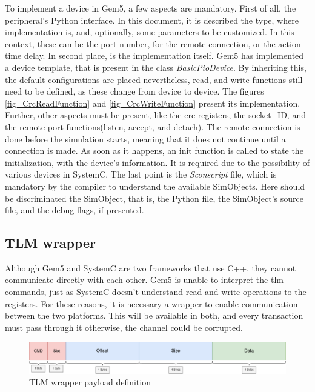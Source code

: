 To implement a device in Gem5, a few aspects are mandatory. First of all, the peripheral's Python interface. In this document, it is 
described the type, where implementation is, and, optionally, some parameters to be customized. In this context, these can be
the port number, for the remote connection, or the action time delay. In second place, is the implementation itself. Gem5 has implemented 
a device template, that is present in the class \textit{BasicPioDevice}. By inheriting this, the default configurations are placed 
nevertheless, read, and write functions still need to be defined, as these change from device to device. The figures \ref{fig_CrcReadFunction} and \ref{fig_CrcWriteFunction}
present its implementation. Further, other aspects must be present, like the \gls{crc} registers, the socket\_ID, and the remote 
port functions(listen, accept, and detach). The remote connection is done before the simulation starts, meaning that it does not
continue until a connection is made. As soon as it happens, an init function is called to state the initialization, with the 
device's information. It is required due to the possibility of various devices in SystemC. The last point is the \textit{Sconscript} file, 
which is mandatory by the compiler to understand the available SimObjects. Here should be discriminated the SimObject, that is, 
the Python file, the SimObject's source file, and the debug flags, if presented.

\subsection{TLM wrapper}
\label{subsec::TLMwrapper}

Although Gem5 and SystemC are two frameworks that use C++, they cannot communicate directly with each other. Gem5 is unable to 
interpret the \gls{tlm} commands, just as SystemC doesn't understand read and write operations to the registers. For these reasons,
it is necessary a wrapper to enable communication between the two platforms. This will be available in both, and every transaction must
pass through it otherwise, the channel could be corrupted. 

\begin{figure}[H]
	\centering
 	\includegraphics[width=0.8\linewidth]{Images/TLM_Wrapper_Payload.png} 
 	\caption{TLM wrapper payload definition}
\end{figure}



